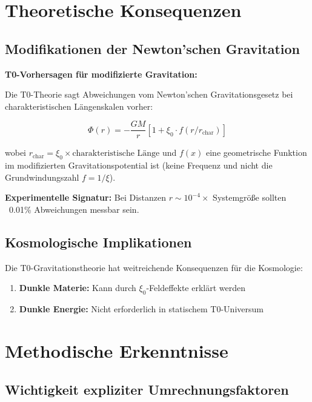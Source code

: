 	\section{Theoretische Konsequenzen}
	
	\subsection{Modifikationen der Newton'schen Gravitation}
	
	\begin{warning}
		\textbf{T0-Vorhersagen für modifizierte Gravitation:}
		
		Die T0-Theorie sagt Abweichungen vom Newton'schen Gravitationsgesetz bei charakteristischen Längenskalen vorher:
		
		\begin{equation}
			\Phi(r) = -\frac{GM}{r} \left[1 + \xi_0 \cdot f(r/r_{\text{char}})\right]
		\end{equation}
		
		wobei $r_{\text{char}} = \xi_0 \times \text{charakteristische Länge}$ und $f(x)$ eine geometrische Funktion im modifizierten Gravitationspotential ist (keine Frequenz und nicht die Grundwindungszahl $f = 1/\xi$).
		
		\textbf{Experimentelle Signatur:} Bei Distanzen $r \sim 10^{-4} \times$ Systemgröße sollten ~0.01\% Abweichungen messbar sein.
	\end{warning}


	\subsection{Kosmologische Implikationen}
	
	Die T0-Gravitationstheorie hat weitreichende Konsequenzen für die Kosmologie:
	
	\begin{enumerate}
		\item \textbf{Dunkle Materie:} Kann durch $\xi_0$-Feldeffekte erklärt werden
		\item \textbf{Dunkle Energie:} Nicht erforderlich in statischem T0-Universum
	\end{enumerate}
	
	\section{Methodische Erkenntnisse}
	
	\subsection{Wichtigkeit expliziter Umrechnungsfaktoren}
	
